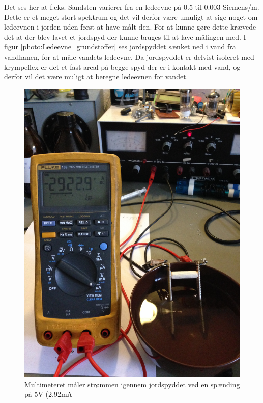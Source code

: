 Det ses her at f.eks. Sandsten varierer fra en ledeevne på 0.5 til 0.003 Siemens/m. Dette er et meget stort spektrum og det vil derfor være umuligt at sige noget om ledeevnen i jorden uden først at have målt den. For at kunne gøre dette krævede det at der blev lavet et jordspyd der kunne bruges til at lave målingen med. I figur \ref{photo:Ledeevne_grundstoffer} ses jordspyddet sænket ned i vand fra vandhanen, for at måle vandets ledeevne. Da jordspyddet er delvist isoleret med krympeflex er det et fast areal på begge spyd der er i kontakt med vand, og derfor vil det være muligt at beregne ledeevnen for vandet.

\begin{figure}[H]
	\centering 
	\includegraphics[scale=0.07]{HardwareArkitektur/Sensore/Jordfugt_billeder/Jordspyd_i_vand.JPG}
	\caption{Multimeteret måler strømmen igennem jordspyddet ved en spænding på 5V (2.92mA}
	\label{photo:Jordspyd_vand}
\end{figure}  

